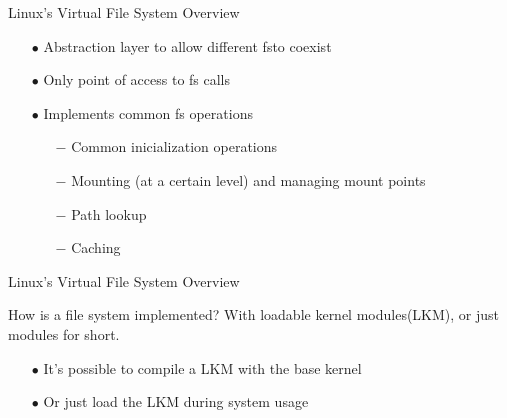 \documentclass{beamer}
\begin{document}
\begin{frame}{Linux's Virtual File System Overview}

	\begin{itemize}[<+->]
	
		\item[$\bullet$]{Abstraction layer to allow different fs\footnotemark[1] to coexist}	
		\item[$\bullet$]{Only point of access to fs calls}
		\item[$\bullet$]{Implements common fs operations}
			\begin{itemize}
				\item[$-$]{Common inicialization operations}
				\item[$-$]{Mounting (at a certain level) and managing mount points}
				\item[$-$]{Path lookup}
				\item[$-$]{Caching}
			\end{itemize}	
	\end{itemize}


\end{frame}

\begin{frame}{Linux's Virtual File System Overview}

	\begin{block}{How is a file system implemented?}
		With loadable kernel modules\footnotemark[1] (LKM), or just modules for short.
	\end{block}

	\vspace{15pt}
	
	\pause

	\begin{itemize}[<+->]
	
		\item[$\bullet$]{It's possible to compile a LKM with the base kernel}
		\item[$\bullet$]{Or just load the LKM during system usage}

	\end{itemize}


\end{frame}

\end{document}
